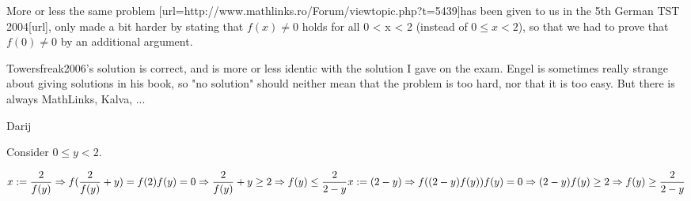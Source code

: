 \begin{solution}
	More or less the same problem [url=http://www.mathlinks.ro/Forum/viewtopic.php?t=5439]has been given to us in the 5th German TST 2004[\/url], only made a bit harder by stating that $f\left(x\right)\neq 0$ holds for all 0 < x < 2 (instead of $0\leq x<2$), so that we had to prove that $f\left(0\right)\neq 0$ by an additional argument.

Towersfreak2006's solution is correct, and is more or less identic with the solution I gave on the exam. Engel is sometimes really strange about giving solutions in his book, so "no solution" should neither mean that the problem is too hard, nor that it is too easy. But there is always MathLinks, Kalva, ...

  Darij
\end{solution}



\begin{solution}
	Consider $ 0\leq y < 2$.

\[ x: =\frac{2}{f(y)} \Rightarrow f(\frac{2}{f(y)}+y)=f(2)f(y)=0 
\Rightarrow \frac{2}{f(y)}+y \geq 2 \Rightarrow f(y) \leq \frac{2}{2-y} \\
x: =(2-y) \Rightarrow f((2-y)f(y))f(y)=0 \Rightarrow (2-y)f(y)\geq 2 \Rightarrow f(y) \geq \frac{2}{2-y}\]
\end{solution}




